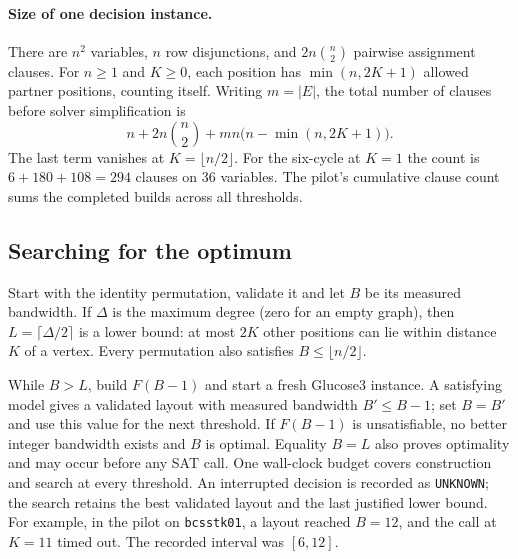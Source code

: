 \paragraph{Size of one decision instance.}
There are $n^2$ variables, $n$ row disjunctions, and
$2n\binom{n}{2}$ pairwise assignment clauses. For $n\ge 1$ and $K\ge 0$,
each position has $\min(n,2K+1)$ allowed partner positions, counting itself.
Writing $m=|E|$, the total number of clauses before solver simplification is
\[
  n+2n\binom{n}{2}+mn\bigl(n-\min(n,2K+1)\bigr).
\]
The last term vanishes at $K=\lfloor n/2\rfloor$. For the six-cycle at
$K=1$ the count is $6+180+108=294$ clauses on 36 variables. The pilot's
cumulative clause count sums the completed builds across all thresholds.

\subsection{Searching for the optimum}
Start with the identity permutation, validate it and let $B$ be its measured
bandwidth. If $\Delta$ is the maximum degree (zero for an empty graph), then
$L=\lceil\Delta/2\rceil$ is a lower bound: at most $2K$ other positions
can lie within distance $K$ of a vertex. Every permutation also satisfies
$B\le\lfloor n/2\rfloor$.

While $B>L$, build $F(B-1)$ and start a fresh Glucose3 instance. A
satisfying model gives a validated layout with measured bandwidth $B'\le B-1$;
set $B=B'$ and use this value for the next threshold. If $F(B-1)$ is
unsatisfiable, no better integer bandwidth exists and $B$ is optimal.
Equality $B=L$ also proves optimality and may occur before any SAT call.
One wall-clock budget covers construction and search at every threshold.
An interrupted decision is recorded as \texttt{UNKNOWN}; the search retains
the best validated layout and the last justified lower bound. For example,
in the pilot on \texttt{bcsstk01}, a layout reached $B=12$, and the call at
$K=11$ timed out. The recorded interval was $[6,12]$.
